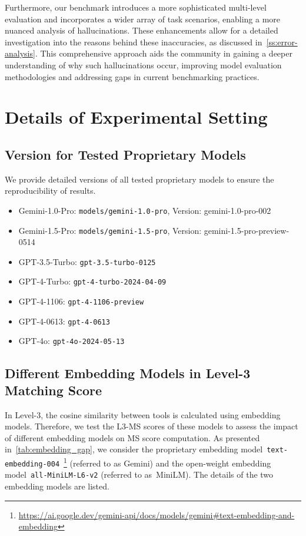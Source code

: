 \documentclass[11pt]{article}
\begin{document}
Furthermore, our benchmark introduces a more sophisticated multi-level evaluation and incorporates a wider array of task scenarios, enabling a more nuanced analysis of hallucinations. 
These enhancements allow for a detailed investigation into the reasons behind these inaccuracies, as discussed in~\cref{ss:error-analysis}. 
This comprehensive approach aids the community in gaining a deeper understanding of why such hallucinations occur, improving model evaluation methodologies and addressing gaps in current benchmarking practices.


\section{Details of Experimental Setting}

\subsection{Version for Tested Proprietary Models}
\label{append:experimental-setting}
 
We provide detailed versions of all tested proprietary models to ensure the reproducibility of results.
\begin{itemize}
\setlength{\itemsep}{1pt}
\setlength{\parskip}{2pt}
\setlength{\parsep}{0pt}
\item Gemini-1.0-Pro: \texttt{models/gemini-1.0-pro}, Version: gemini-1.0-pro-002
\item Gemini-1.5-Pro: \texttt{models/gemini-1.5-pro}, Version: gemini-1.5-pro-preview-0514
\item GPT-3.5-Turbo: \texttt{gpt-3.5-turbo-0125}
\item GPT-4-Turbo: \texttt{gpt-4-turbo-2024-04-09}
\item GPT-4-1106: \texttt{gpt-4-1106-preview}
\item GPT-4-0613: \texttt{gpt-4-0613}
\item GPT-4o: \texttt{gpt-4o-2024-05-13}
\end{itemize}

\subsection{Different Embedding Models in Level-3 Matching Score}

In Level-3, the cosine similarity between tools is calculated using embedding models.
Therefore, we test the L3-MS scores of these models to assess the impact of different embedding models on MS score computation.
As presented in~\cref{tab:embedding_gap}, we consider the proprietary embedding model~\texttt{text-embedding-004}~\footnote{\url{https://ai.google.dev/gemini-api/docs/models/gemini\#text-embedding-and-embedding}} (referred to as Gemini) and the open-weight embedding model~\texttt{all-MiniLM-L6-v2} (referred to as~MiniLM).
The details of the two embedding models are listed.
\end{document}
